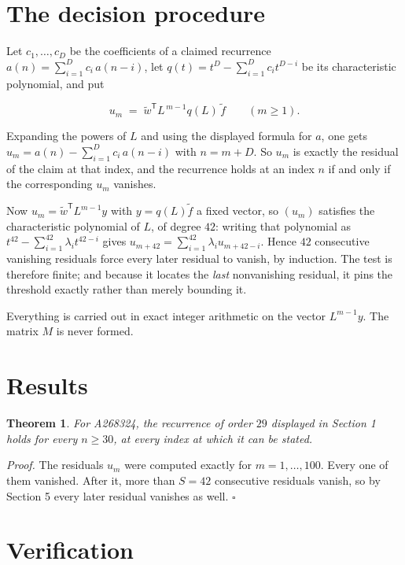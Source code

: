 \documentclass[11pt]{article}
\newtheorem{theorem}{Theorem}
\theoremstyle{definition}
\begin{document}
\section{The decision procedure}

Let $c_1,\dots,c_D$ be the coefficients of a claimed recurrence $a(n) = \sum_{i=1}^{D} c_i\,a(n-i)$, let $q(t) = t^{D} - \sum_{i=1}^{D} c_i t^{D-i}$ be its characteristic polynomial, and put

\[u_m \;=\; \tilde w^{\mathsf T} L^{\,m-1} q(L)\,\tilde f \qquad (m \ge 1).\]

Expanding the powers of $L$ and using the displayed formula for $a$, one gets $u_m = a(n) - \sum_{i=1}^{D} c_i\,a(n-i)$ with $n = m + D$. So $u_m$ is exactly the residual of the claim at that index, and the recurrence holds at an index $n$ if and only if the corresponding $u_m$ vanishes.

Now $u_m = \tilde w^{\mathsf T} L^{m-1} y$ with $y = q(L)\tilde f$ a fixed vector, so $(u_m)$ satisfies the characteristic polynomial of $L$, of degree $42$: writing that polynomial as $t^{42} - \sum_{i=1}^{42} \lambda_i t^{42-i}$ gives $u_{m+42} = \sum_{i=1}^{42} \lambda_i u_{m+42-i}$. Hence $42$ consecutive vanishing residuals force every later residual to vanish, by induction. The test is therefore finite; and because it locates the {\itshape last} nonvanishing residual, it pins the threshold exactly rather than merely bounding it.

Everything is carried out in exact integer arithmetic on the vector $L^{m-1}y$. The matrix $M$ is never formed.

\section{Results}

\begin{theorem} For A268324, the recurrence of order $29$ displayed in Section 1 holds for every $n \ge 30$, at every index at which it can be stated.\end{theorem}

{\itshape Proof.} The residuals $u_m$ were computed exactly for $m = 1,\dots,100$. Every one of them vanished. After it, more than $S = 42$ consecutive residuals vanish, so by Section 5 every later residual vanishes as well. $\square$

\section{Verification}
\end{document}
